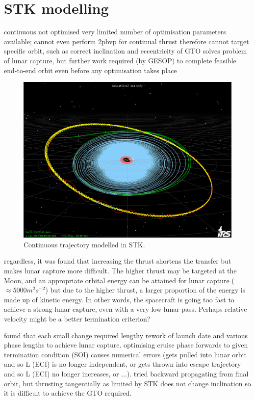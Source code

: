 \clearpage

\section{STK modelling} \label{sec:STK}

continuous
not optimised
very limited number of optimisation parameters available; cannot even perform 2pbvp for continual thrust
therefore cannot target specific orbit, such as correct inclination and eccentricity of GTO
solves problem of lunar capture, but further work required (by GESOP) to complete feasible end-to-end orbit even before any optimisation takes place

\begin{figure}
\centering
\includegraphics[width=\textwidth]{Images/STK/trajectory1b.png}
\caption{Continuous trajectory modelled in STK.}
\label{fig:STK}
\end{figure}

regardless, it was found that increasing the thrust shortens the transfer but makes lunar capture more difficult. The higher thrust may be targeted at the Moon, and an appropriate orbital energy can be attained for lunar capture ($\approx5000m^2s^{-2}$) but due to the higher thrust, a larger proportion of the energy is made up of kinetic energy. In other words, the spacecraft is going too fast to achieve a strong lunar capture, even with a very low lunar pass. Perhaps relative velocity might be a better termination criterion?

found that each small change required lengthy rework of launch date and various phase lengths to achieve lunar capture. 
optimising cruise phase forwards to given termination condition (SOI) causes numerical errors (gets pulled into lunar orbit and so L (ECI) is no longer independent, or gets thrown into escape trajectory and so L (ECI) no longer increases, or ...).
tried backward propagating from final orbit, but thrusting tangentially as limited by STK does not change inclination so it is difficult to achieve the GTO required.

